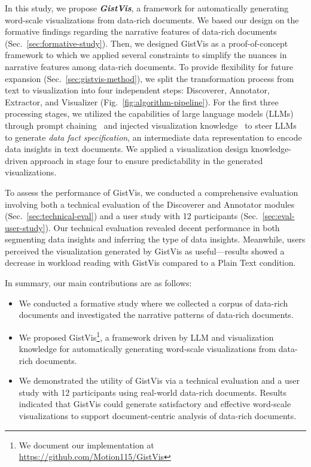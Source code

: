 In this study, we propose \textbf{\textit{GistVis}}, a framework for automatically generating word-scale visualizations from data-rich documents. We based our design on the formative findings regarding the narrative features of data-rich documents (Sec.~\ref{sec:formative-study}). Then, we designed GistVis as a proof-of-concept framework to which we applied several constraints to simplify the nuances in narrative features among data-rich documents. To provide flexibility for future expansion (Sec.~\ref{sec:gistvis-method}), we split the transformation process from text to visualization into four independent steps: Discoverer, Annotator, Extractor, and Visualizer (Fig.~\ref{fig:algorithm-pipeline}). For the first three processing stages, we utilized the capabilities of large language models (LLMs) through prompt chaining~\cite{wu2022ai} and injected visualization knowledge~\cite{wang2020datashot, amar2005lowlevel, chen2009effective} to steer LLMs to generate \textit{data fact specification}, an intermediate data representation to encode data insights in text documents. We applied a visualization design knowledge-driven approach in stage four to ensure predictability in the generated visualizations.

To assess the performance of GistVis, we conducted a comprehensive evaluation involving both a technical evaluation of the Discoverer and Annotator modules (Sec.~\ref{sec:technical-eval}) and a user study with 12 participants (Sec.~\ref{sec:eval-user-study}). Our technical evaluation revealed decent performance in both segmenting data insights and inferring the type of data insights. Meanwhile, users perceived the visualization generated by GistVis as useful—results showed a decrease in workload reading with GistVis compared to a Plain Text condition.

In summary, our main contributions are as follows:
\begin{itemize}%
    \item We conducted a formative study where we collected a corpus of data-rich documents and investigated the narrative patterns of data-rich documents.
    \item We proposed GistVis\footnote{We document our implementation at \url{https://github.com/Motion115/GistVis}}, a framework driven by LLM and visualization knowledge for automatically generating word-scale visualizations from data-rich documents. %
    \item We demonstrated the utility of GistVis via a technical evaluation and a user study with 12 participants using real-world data-rich documents. Results indicated that GistVis could generate satisfactory and effective word-scale visualizations to support document-centric analysis of data-rich documents.
\end{itemize}
